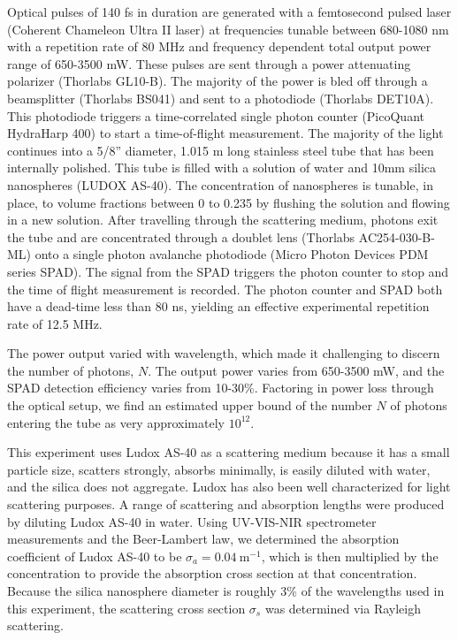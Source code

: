 \documentclass[floatfix,aps,prl,reprint,groupedaddress]{revtex4-2}
\begin{document}
Optical pulses of 140 fs in duration are generated with a femtosecond pulsed laser (Coherent Chameleon Ultra II laser) at frequencies tunable between 680-1080 nm with a repetition rate of 80 MHz and frequency dependent total output power range of 650-3500 mW. These pulses are sent through a power attenuating polarizer (Thorlabs GL10-B).  The majority of the power is bled off through a beamsplitter (Thorlabs BS041) and sent to a photodiode (Thorlabs DET10A).  This photodiode triggers a time-correlated single photon counter (PicoQuant HydraHarp 400) to start a time-of-flight measurement.  The majority of the light continues into a 5/8'' diameter, 1.015 m long stainless steel tube that has been internally polished.  This tube is filled with a solution of water and 10mm silica nanospheres (LUDOX AS-40).  The concentration of nanospheres is tunable, in place, to volume fractions between 0 to 0.235 by flushing the solution and flowing in a new solution.  After travelling through the scattering medium, photons exit the tube and are concentrated through a doublet lens (Thorlabs AC254-030-B-ML) onto a single photon avalanche photodiode (Micro Photon Devices PDM series SPAD).  The signal from the SPAD triggers the photon counter to stop and the time of flight measurement is recorded.  The photon counter and SPAD both have a dead-time less than 80 ns, yielding an effective experimental repetition rate of 12.5 MHz.

The power output varied with wavelength, which made it challenging to discern the number of photons, $N$. The output power varies from 650-3500 mW, and the SPAD detection efficiency varies from 10-30\%.  Factoring in power loss through the optical setup, we find an estimated upper bound of the number $N$ of photons entering the tube as very approximately $10^{12}$.

This experiment uses Ludox AS-40 as a scattering medium because it has a small particle size, scatters strongly, absorbs minimally, is easily diluted with water, and the silica does not aggregate. Ludox has also been well characterized for light scattering purposes\cite{dezelic_determination_1960,bonnelycke_light_1959,goring_light-scattering_1957}. A range of scattering and absorption lengths were produced by diluting Ludox AS-40 in water. Using UV-VIS-NIR spectrometer measurements and the Beer-Lambert law, we determined the absorption coefficient of Ludox AS-40 to be $\sigma_{a}=0.04\ \textrm{m}^{-1}$, which is then multiplied by the concentration to provide the absorption cross section at that concentration. Because the silica nanosphere diameter is roughly 3\% of the wavelengths used in this experiment, the scattering cross section $\sigma_{s}$ was determined via Rayleigh scattering. 
\end{document}
